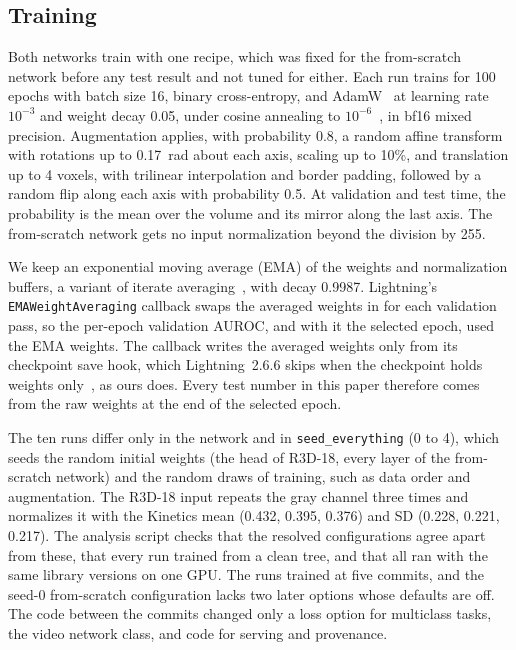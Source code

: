 \documentclass[conference]{IEEEtran}
\newif\ifanycitation
\let\citeAnyKey\cite
\renewcommand{\cite}{\global\anycitationtrue\citeAnyKey}
\begin{document}
\subsection{Training}

Both networks train with one recipe, which was fixed for the from-scratch network before
any test result and not tuned for either. Each run trains for 100 epochs with batch size 16,
binary cross-entropy, and AdamW~\cite{loshchilov2019decoupled} at learning rate $10^{-3}$
and weight decay 0.05, under cosine annealing to $10^{-6}$~\cite{loshchilov2017sgdr}, in
bf16 mixed precision. Augmentation applies, with probability 0.8, a random affine transform
with rotations up to 0.17~rad about each axis, scaling up to 10\%, and translation up to 4
voxels, with trilinear interpolation and border padding, followed by a random flip along each axis with probability 0.5. At validation and test time, the probability is the mean over the volume and its mirror
along the last axis. The from-scratch network gets no input normalization beyond the
division by 255.

We keep an exponential moving average (EMA) of the weights and normalization buffers, a
variant of iterate averaging~\cite{polyak1992averaging}, with decay 0.9987. Lightning's \texttt{EMAWeightAveraging} callback swaps the averaged weights in
for each validation pass, so the per-epoch validation AUROC, and with it the selected epoch,
used the EMA weights. The callback writes the averaged weights only from its checkpoint save
hook, which Lightning~2.6.6 skips when the checkpoint holds weights
only~\cite{lightning266checkpoint}, as ours does. Every test number in this paper therefore
comes from the raw weights at the end of the selected epoch.

The ten runs differ only in the network and in \texttt{seed\_everything} (0 to 4), which
seeds the random initial weights (the head of R3D-18, every layer of the from-scratch
network) and the random draws of training, such as data order and augmentation. The
R3D-18 input repeats the gray channel three times and normalizes it with the Kinetics mean
(0.432, 0.395, 0.376) and SD (0.228, 0.221, 0.217). The analysis script checks that the
resolved configurations agree apart from these, that every run trained from a clean tree,
and that all ran with the same library versions on one GPU. The runs trained at five
commits, and the seed-0 from-scratch configuration lacks two later options whose defaults
are off. The code between the commits changed only a loss option for multiclass tasks, the
video network class, and code for serving and provenance.
\end{document}
